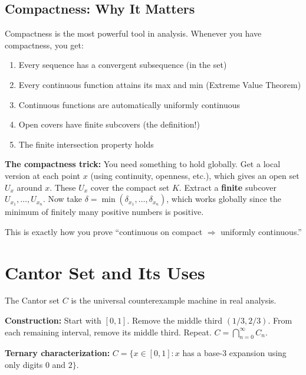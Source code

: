 \documentclass[11pt]{article}
\theoremstyle{definition}
\begin{document}
\subsection{Compactness: Why It Matters}

Compactness is the most powerful tool in analysis. Whenever you have compactness, you get:

\begin{enumerate}
\item Every sequence has a convergent subsequence (in the set)
\item Every continuous function attains its max and min (Extreme Value Theorem)
\item Continuous functions are automatically uniformly continuous
\item Open covers have finite subcovers (the definition!)
\item The finite intersection property holds
\end{enumerate}

\begin{application}
\textbf{The compactness trick:} You need something to hold globally. Get a local version at each point $x$ (using continuity, openness, etc.), which gives an open set $U_x$ around $x$. These $U_x$ cover the compact set $K$. Extract a \textbf{finite} subcover $U_{x_1}, \ldots, U_{x_n}$. Now take $\delta = \min(\delta_{x_1}, \ldots, \delta_{x_n})$, which works globally since the minimum of finitely many positive numbers is positive.

This is exactly how you prove ``continuous on compact $\Rightarrow$ uniformly continuous.''
\end{application}

\section{Cantor Set and Its Uses}

The Cantor set $C$ is the universal counterexample machine in real analysis.

\textbf{Construction:} Start with $[0, 1]$. Remove the middle third $(1/3, 2/3)$. From each remaining interval, remove its middle third. Repeat. $C = \bigcap_{n=0}^\infty C_n$.

\textbf{Ternary characterization:} $C = \{x \in [0, 1] : x$ has a base-3 expansion using only digits $0$ and $2\}$.
\end{document}
